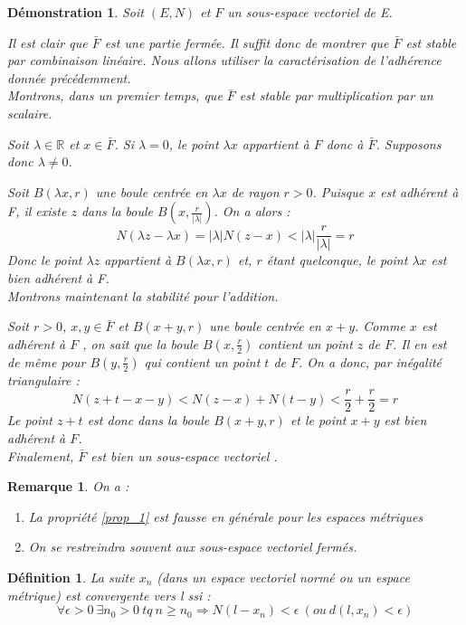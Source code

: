 \documentclass[a4paper, oneside]{report}
\theoremstyle{break}
\newtheorem{defi}[thm]{Définition}
\newtheorem*{demo}{Démonstration}
\newtheorem{remar}[thm]{Remarque}
\newcommand{\R}{\mathbb{R}}
\newcommand{\sev}{sous-espace vectoriel }
\newcommand{\ev}{espace vectoriel }
\begin{document}
\begin{demo}
Soit $(E,N)$ et $F$ un \sev de E. 

Il est clair que $\bar{F}$ est une partie fermée. Il suffit donc de montrer que $\bar{F}$ est stable par combinaison linéaire. Nous allons utiliser la caractérisation de l'adhérence donnée précédemment. \\

Montrons, dans un premier temps, que $\bar{F}$ est stable par multiplication par un scalaire. 

Soit $\lambda \in \R$ et $x \in \bar{F}$. Si $\lambda = 0$, le point $\lambda x$ appartient à $F$ donc à $\bar{F}$. Supposons donc $\lambda \neq 0$.

Soit $B(\lambda x, r)$ une boule centrée en $\lambda x$ de rayon $r > 0$. Puisque $x$ est adhérent à F, il existe $z$ dans la boule $B(x,\frac{r}{|\lambda|})$. On a alors :
$$N(\lambda z - \lambda x) = |\lambda|N(z-x) < |\lambda|\frac{r}{|\lambda|} = r$$
Donc le point $\lambda z$ appartient à $B(\lambda x, r)$ et, $r$ étant quelconque, le point $\lambda x$ est bien adhérent à F. \\

Montrons maintenant la stabilité pour l'addition.

Soit $r>0$, $x,y\in \bar{F}$ et $B(x+y,r)$ une boule centrée en $x + y$. Comme $x$ est adhérent à $F$ , on sait que
la boule $B(x, \frac{r}{2})$ contient un point $z$ de $F$. Il en est de même pour $B(y, \frac{r}{2})$ qui contient un point $t$ de $F$. On a donc, par inégalité triangulaire : $$N(z+t-x-y)< N(z-x)+N(t-y)<\frac{r}{2} + \frac{r}{2} = r$$
Le point $z + t$ est donc dans la boule $B(x + y, r)$ et le point $x + y$ est bien adhérent à $F$.\\

Finalement, $\bar{F}$ est bien un \sev.
\end{demo}



\begin{remar}
On a :
\begin{enumerate}
\item La propriété \ref{prop_1} est fausse en générale pour les espaces métriques
\item On se restreindra souvent aux \sev fermés.
\end{enumerate}
\end{remar}


\begin{defi}                    
La suite $x_n$ (dans un \ev normé ou un espace métrique) est convergente vers l ssi :
$$\forall \epsilon >0~ \exists n_0>0~tq~n\geq n_0 \Rightarrow N(l-x_n)<\epsilon~(ou~d(l,x_n)<\epsilon)$$
\end{defi}
\end{document}

